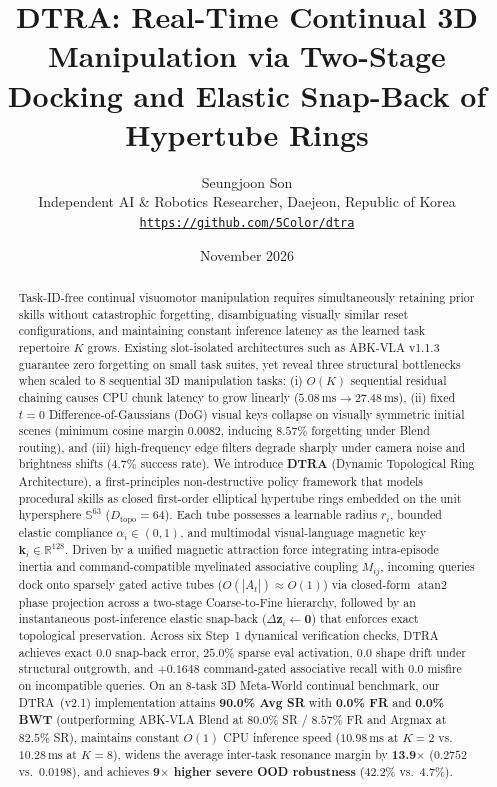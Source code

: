\documentclass[10pt,twocolumn]{article}
\title{\textbf{DTRA: Real-Time Continual 3D Manipulation via Two-Stage Docking and Elastic Snap-Back of Hypertube Rings}}
\author{
  Seungjoon Son \\
  Independent AI \& Robotics Researcher, Daejeon, Republic of Korea \\
  \texttt{\href{https://github.com/5Color/dtra}{https://github.com/5Color/dtra}}
}
\date{November 2026}
\begin{document}
\maketitle

\begin{abstract}
Task-ID-free continual visuomotor manipulation requires simultaneously retaining prior skills without catastrophic forgetting, disambiguating visually similar reset configurations, and maintaining constant inference latency as the learned task repertoire $K$ grows. Existing slot-isolated architectures such as ABK-VLA v1.1.3~\cite{son2026abkvla} guarantee zero forgetting on small task suites, yet reveal three structural bottlenecks when scaled to 8 sequential 3D manipulation tasks: (i) $O(K)$ sequential residual chaining causes CPU chunk latency to grow linearly ($5.08\,\text{ms} \to 27.48\,\text{ms}$), (ii) fixed $t=0$ Difference-of-Gaussians (DoG) visual keys collapse on visually symmetric initial scenes (minimum cosine margin $0.0082$, inducing $8.57\%$ forgetting under Blend routing), and (iii) high-frequency edge filters degrade sharply under camera noise and brightness shifts ($4.7\%$ success rate). We introduce \textbf{DTRA} (Dynamic Topological Ring Architecture), a first-principles non-destructive policy framework that models procedural skills as closed first-order elliptical hypertube rings embedded on the unit hypersphere $\mathbb{S}^{63}$ ($D_{\text{topo}}=64$). Each tube possesses a learnable radius $r_i$, bounded elastic compliance $\alpha_i \in (0,1)$, and multimodal visual-language magnetic key $\mathbf{k}_i \in \mathbb{R}^{128}$. Driven by a unified magnetic attraction force integrating intra-episode inertia and command-compatible myelinated associative coupling $M_{ij}$, incoming queries dock onto sparsely gated active tubes ($O(|A_t|) \approx O(1)$) via closed-form $\operatorname{atan2}$ phase projection across a two-stage Coarse-to-Fine hierarchy, followed by an instantaneous post-inference elastic snap-back ($\Delta\mathbf{z}_i \leftarrow \mathbf{0}$) that enforces exact topological preservation. Across six Step~1 dynamical verification checks, DTRA achieves exact $0.0$ snap-back error, $25.0\%$ sparse eval activation, $0.0$ shape drift under structural outgrowth, and $+0.1648$ command-gated associative recall with $0.0$ misfire on incompatible queries. On an 8-task 3D Meta-World continual benchmark, our DTRA~(v2.1) implementation attains \textbf{90.0\% Avg SR} with \textbf{0.0\% FR} and \textbf{0.0\% BWT} (outperforming ABK-VLA Blend at $80.0\%$ SR / $8.57\%$ FR and Argmax at $82.5\%$ SR), maintains constant $O(1)$ CPU inference speed ($10.98\,\text{ms}$ at $K=2$ vs.\ $10.28\,\text{ms}$ at $K=8$), widens the average inter-task resonance margin by \textbf{13.9$\times$} ($0.2752$ vs.\ $0.0198$), and achieves \textbf{9$\times$ higher severe OOD robustness} ($42.2\%$ vs.\ $4.7\%$).
\end{abstract}
\end{document}
